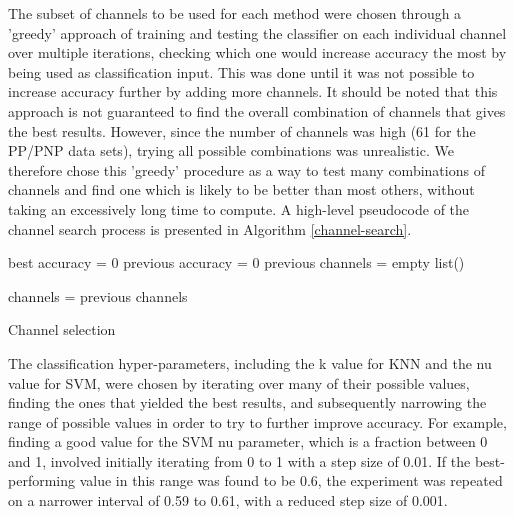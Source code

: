 \documentclass{mpaper}
\begin{document}
The subset of channels to be used for each method were chosen through a 'greedy' approach of training and testing the classifier on each individual channel over multiple iterations, checking which one would increase accuracy the most by being used as classification input. This was done until it was not possible to increase accuracy further by adding more channels. It should be noted that this approach is not guaranteed to find the overall combination of channels that gives the best results. However, since the number of channels was high (61 for the PP/PNP data sets), trying all possible combinations was unrealistic. We therefore chose this 'greedy' procedure as a way to test many combinations of channels and find one which is likely to be better than most others, without taking an excessively long time to compute. A high-level pseudocode of the channel search process is presented in Algorithm \ref{channel-search}.

\begin{algorithm}
    \BlankLine
    best accuracy = 0\;
    previous accuracy = 0\;
    previous channels = empty list()\;
    
    channels = previous channels\;
    
    
    \caption{Channel selection}
    \label{channel-search}
\end{algorithm}

The classification hyper-parameters, including the k value for KNN and the nu value for SVM, were chosen by iterating over many of their possible values, finding the ones that yielded the best results, and subsequently narrowing the range of possible values in order to try to further improve accuracy. For example, finding a good value for the SVM nu parameter, which is a fraction between 0 and 1, involved initially iterating from 0 to 1 with a step size of 0.01. If the best-performing value in this range was found to be 0.6, the experiment was repeated on a narrower interval of 0.59 to 0.61, with a reduced step size of 0.001.
\end{document}
